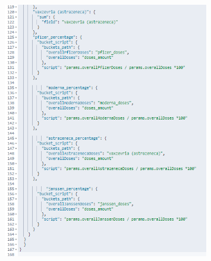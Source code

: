\documentclass{article}[IEEEtran]
\begin{document}
\begin{figure}[H]
\begin{center}
\begin{minipage}[b]{0.4\textwidth}
    \includegraphics[width=0.8\textwidth, frame]{Query_2BIS_3.PNG}
     \subcaption{}
  \end{minipage}
    \hfill 
\begin{minipage}[b]{0.4\textwidth}

\end{minipage}
\end{center}
\end{figure}
\end{document}
